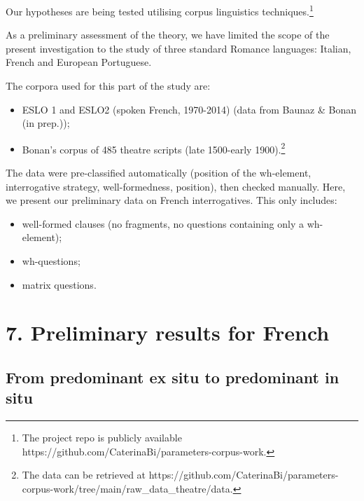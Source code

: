 \documentclass[fleqn,10pt]{wlscirep}
\begin{document}
Our hypotheses are being tested utilising corpus linguistics techniques.\footnote{The project repo is publicly available https://github.com/CaterinaBi/parameters-corpus-work.}
 
As a preliminary assessment of the theory, we have limited the scope of the present investigation to the study of three standard Romance languages: Italian, French and European Portuguese. 

\noindent The corpora used for this part of the study are: 

\begin{itemize}
\item[\ding{227}] \vspace*{-2mm} ESLO 1 and ESLO2 (spoken French, 1970-2014) (data from Baunaz \& Bonan (in prep.));
\item[\ding{227}] \vspace*{-2mm} Bonan's corpus of 485 theatre scripts (late 1500-early 1900).\footnote{The data can be retrieved at https://github.com/CaterinaBi/parameters-corpus-work/tree/main/raw_data_theatre/data.}
\end{itemize}

\noindent The data were pre-classified automatically (position of the wh-element, interrogative strategy, well-formedness, position), then checked manually.
\noindent Here, we present our preliminary data on French interrogatives. This only includes:
\begin{itemize}
    \item[\ding{227}] \vspace*{-2mm} well-formed clauses (no fragments, no questions containing only a wh-element);
    \item[\ding{227}] \vspace*{-2mm} wh-questions;
    \item[\ding{227}] \vspace*{-2mm} matrix questions.
\end{itemize}

\section*{7. Preliminary results for French}

\subsection*{From predominant ex situ to predominant in situ}
\end{document}
